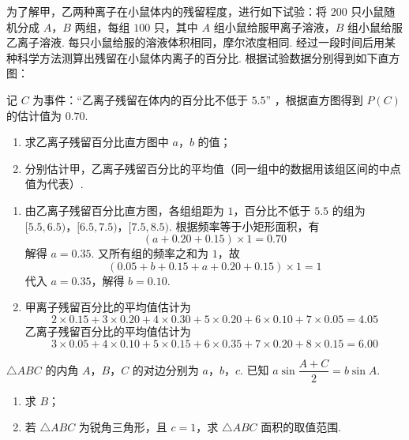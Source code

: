 \begin{problem}
为了解甲，乙两种离子在小鼠体内的残留程度，进行如下试验：将 \(200\) 只小鼠随机分成 \(A\)，\(B\) 两组，每组 \(100\) 只，其中 \(A\) 组小鼠给服甲离子溶液，\(B\) 组小鼠给服乙离子溶液. 每只小鼠给服的溶液体积相同，摩尔浓度相同. 经过一段时间后用某种科学方法测算出残留在小鼠体内离子的百分比. 根据试验数据分别得到如下直方图：

记 \(C\) 为事件：“乙离子残留在体内的百分比不低于 \(5.5\)” ，根据直方图得到 \(P(C)\) 的估计值为 \(0.70\).

\begin{enumerate}
\item 求乙离子残留百分比直方图中 \(a\)，\(b\) 的值；
\item 分别估计甲，乙离子残留百分比的平均值（同一组中的数据用该组区间的中点值为代表）.
\end{enumerate}

\end{problem}

\begin{solution}
\begin{enumerate}
\item 由乙离子残留百分比直方图，各组组距为 \(1\)，百分比不低于 \(5.5\) 的组为 \([5.5,6.5)\)，\([6.5,7.5)\)，\([7.5,8.5)\). 根据频率等于小矩形面积，有
\[
(a+0.20+0.15)\times1=0.70
\]
解得 \(a=0.35\). 又所有组的频率之和为 \(1\)，故
\[
(0.05+b+0.15+a+0.20+0.15)\times1=1
\]
代入 \(a=0.35\)，解得 \(b=0.10\).

\item 甲离子残留百分比的平均值估计为
\[
2\times0.15+3\times0.20+4\times0.30+5\times0.20+6\times0.10+7\times0.05=4.05
\]
乙离子残留百分比的平均值估计为
\[
3\times0.05+4\times0.10+5\times0.15+6\times0.35+7\times0.20+8\times0.15=6.00
\]
\end{enumerate}
\end{solution}

\begin{problem}
\(\triangle ABC\) 的内角 \(A\)，\(B\)，\(C\) 的对边分别为 \(a\)，\(b\)，\(c\). 已知 \(a\sin\dfrac{A+C}{2}=b\sin A\).

\begin{enumerate}
\item 求 \(B\)；
\item 若 \(\triangle ABC\) 为锐角三角形，且 \(c=1\)，求 \(\triangle ABC\) 面积的取值范围.
\end{enumerate}
\end{problem}


